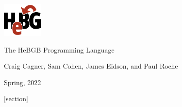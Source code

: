 \documentclass[12pt]{article}
\begin{document}


\newcommand{\Comment}[1]{\color{LightGray}#1}
\newcommand{\Term}[1]{\textbf{\color{Mahogany}\texttt{#1}}}
\newcommand{\Non}[1]{\textit{#1}}
\newcommand{\Eq}{$::=$}
\newcommand{\Or}{$|$}

\begin{center}
\includegraphics[width=2cm]{logo.png}

\bigskip
\begin{bfseries}
\begin{Large}The HeBGB Programming Language\end{Large}
\end{bfseries}

\bigskip
Craig Cagner, Sam Cohen, James Eidson, and Paul Roche

\bigskip
Spring, 2022
\end{center}

[section]\setcounter{rule}{0}
\renewcommand{\therule}{\arabic{section}.\arabic{rule}}

\newenvironment{rule_box}[1][]{
\refstepcounter{rule}
\ifstrempty{#1}%
{\mdfsetup{%
frametitle={%
    \tikz[baseline=(current bounding box.east),outer sep=0pt]
    \node[anchor=east,rectangle,fill=white]
    {\strut \therule};}
}%
}{\mdfsetup{%
frametitle={%
    \tikz[baseline=(current bounding box.east),outer sep=0pt]
    \node[anchor=east,rectangle,fill=white]
    {\strut \therule:~#1};}%
}%
}%
\mdfsetup{%
    innertopmargin=10pt,linecolor=black,%
    linewidth=1pt,topline=true,%
    frametitleaboveskip=\dimexpr-\ht\strutbox\relax%
}
\begin{mdframed}[]\relax}{%
\end{mdframed}}
\end{document}
